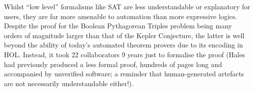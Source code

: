 \documentclass{article}
\begin{document}
Whilst ``low level'' formalisms like SAT are less understandable or explanatory
for users, they are far more amenable to automation than more expressive logics.
Despite the proof for the Boolean Pythagorean Triples problem being many orders
of magnitude larger than that of the Kepler Conjecture, the latter is well
beyond the ability of today's automated theorem provers due to its encoding in
HOL. Instead, it took 22 collaborators 9 years just to formalise the proof
(Hales had previously produced a less formal proof, hundreds of pages long and
accompanied by unverified software; a reminder that human-generated artefacts
are not necessarily understandable either!).







\end{document}
